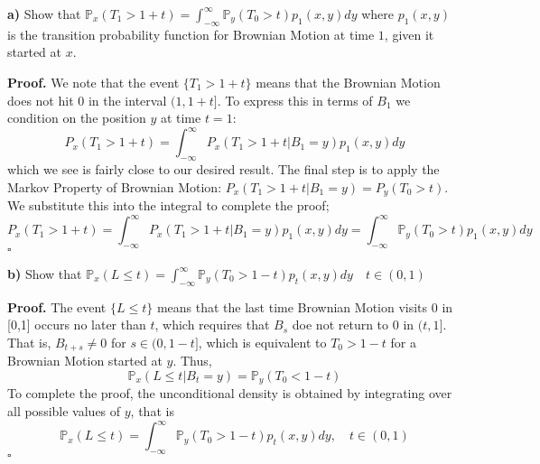 \documentclass{article}
\begin{document}
\begin{tcolorbox}
[colframe=black,colback=gray!5,boxrule=0.5pt]
\textbf{a)} Show that $\mathbb{P}_x(T_1>1+t)=\int_{-\infty}^{\infty} \mathbb{P}_y(T_0>t)p_1(x,y)dy$ where $p_1(x,y)$ is the transition probability function for Brownian Motion at time $1$, given it started at $x$. 
\end{tcolorbox}
\textbf{Proof.} We note that the event $\{T_1 > 1+t\}$ means that the Brownian Motion does not hit 0 in the interval $(1, 1+t]$. To express this in terms of $B_1$ we condition on the position $y$ at time $t=1$: 
$$P_x(T_1 >1+t) = \int_{-\infty}^{\infty} P_x(T_1>1+t|B_1=y)p_1(x,y)dy$$
which we see is fairly close to our desired result. The final step is to apply the Markov Property of Brownian Motion: $P_x(T_1>1+t|B_1=y) = P_y(T_0>t)$. We substitute this into the integral to complete the proof; 
$$P_x(T_1 >1+t) = \int_{-\infty}^{\infty} P_x(T_1>1+t|B_1=y)p_1(x,y)dy = \int_{-\infty}^{\infty} \mathbb{P}_y(T_0>t)p_1(x,y)dy$$
$\square$


\begin{tcolorbox}
[colframe=black,colback=gray!5,boxrule=0.5pt]
\textbf{b)} Show that $\mathbb{P}_x(L\leq t) = \int_{-\infty}^{\infty}\mathbb{P}_y(T_0>1-t)p_{t}(x,y)dy\quad t\in(0,1)$ 
\end{tcolorbox}
\textbf{Proof.} The event $\{L\leq t\}$ means that the last time Brownian Motion visits 0 in [0,1] occurs no later than $t$, which requires that $B_s$ doe not return to 0 in $(t,1]$. That is, $B_{t+s}\neq0$ for $s\in(0,1-t]$, which is equivalent to $T_0 >1-t$ for a Brownian Motion started at $y$. Thus, 
$$\mathbb{P}_x(L\leq t|B_t=y) = \mathbb{P}_y(T_0<1-t)$$
To complete the proof, the unconditional density is obtained by integrating over all possible values of $y$, that is
$$\mathbb{P}_x(L\leq t) = \int_{-\infty}^{\infty}\mathbb{P}_y(T_0>1-t)p_{t}(x,y)dy, \quad t\in(0,1)$$
$\square$
\end{document}
